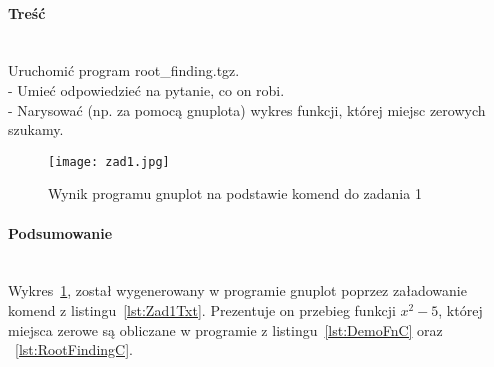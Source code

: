 \paragraph{Treść}~\\
Uruchomić program root\_finding.tgz.\\
- Umieć odpowiedzieć na pytanie, co on robi.\\
- Narysować (np. za pomocą gnuplota) wykres funkcji, której miejsc zerowych szukamy.







\begin{figure}[p]
  \caption{Wynik programu gnuplot na podstawie komend do zadania 1}
  \label{fig:Zad1Jpg}
  \centering
  \texttt{[image: zad1.jpg]}
\end{figure}

\paragraph{Podsumowanie}~\\
Wykres~\ref{fig:Zad1Jpg}, został wygenerowany w programie gnuplot poprzez załadowanie komend z listingu~\ref{lst:Zad1Txt}.
Prezentuje on przebieg funkcji $ x^2 - 5 $, której miejsca zerowe są obliczane w programie z listingu~\ref{lst:DemoFnC} oraz ~\ref{lst:RootFindingC}.
